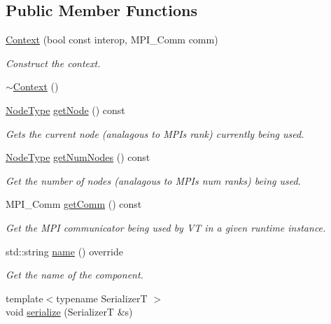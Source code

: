 \subsection*{Public Member Functions}
\begin{DoxyCompactItemize}
\item 
\hyperlink{structvt_1_1ctx_1_1_context_aa00297fe6a9bde8202b4099ede6069fc}{Context} (bool const interop, M\+P\+I\+\_\+\+Comm comm)
\begin{DoxyCompactList}\small\item\em Construct the context. \end{DoxyCompactList}\item 
\hyperlink{structvt_1_1ctx_1_1_context_aa916f841807f2a1b913df33f782715af}{$\sim$\+Context} ()
\item 
\hyperlink{namespacevt_a866da9d0efc19c0a1ce79e9e492f47e2}{Node\+Type} \hyperlink{structvt_1_1ctx_1_1_context_a0d52c263ce8516546a67443d9a86fa5f}{get\+Node} () const
\begin{DoxyCompactList}\small\item\em Gets the current node (analagous to M\+PI\textquotesingle{}s rank) currently being used. \end{DoxyCompactList}\item 
\hyperlink{namespacevt_a866da9d0efc19c0a1ce79e9e492f47e2}{Node\+Type} \hyperlink{structvt_1_1ctx_1_1_context_a7f41071aadf6d5fa9e1b6c703c5ff19d}{get\+Num\+Nodes} () const
\begin{DoxyCompactList}\small\item\em Get the number of nodes (analagous to M\+PI\textquotesingle{}s num ranks) being used. \end{DoxyCompactList}\item 
M\+P\+I\+\_\+\+Comm \hyperlink{structvt_1_1ctx_1_1_context_a2d4378c97824792991a3410449cf19db}{get\+Comm} () const
\begin{DoxyCompactList}\small\item\em Get the M\+PI communicator being used by VT in a given runtime instance. \end{DoxyCompactList}\item 
std\+::string \hyperlink{structvt_1_1ctx_1_1_context_a6bef35c171d45feb409d7b6aa6168996}{name} () override
\begin{DoxyCompactList}\small\item\em Get the name of the component. \end{DoxyCompactList}\item 
{\footnotesize template$<$typename SerializerT $>$ }\\void \hyperlink{structvt_1_1ctx_1_1_context_a510b7a30a4e10b95528a8a9c2306a075}{serialize} (SerializerT \&s)

\end{DoxyCompactItemize}

